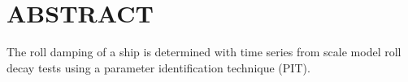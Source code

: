 \section*{ABSTRACT}\label{abstract}
The roll damping of a ship is determined with time series from scale
model roll decay tests using a parameter identification technique (PIT).
